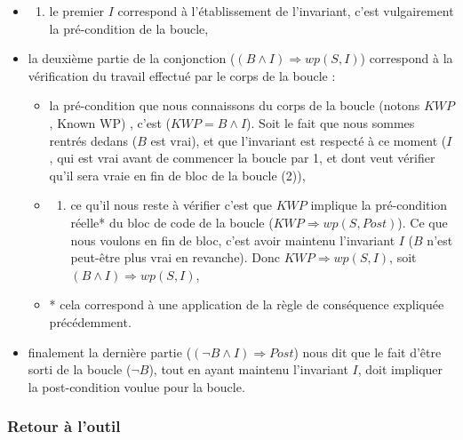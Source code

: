 \documentclass[12pt,francais,]{scrbook}
\providecommand{\tightlist}{%
  \setlength{\itemsep}{0pt}\setlength{\parskip}{0pt}}
\begin{document}
\begin{itemize}
\item
  \begin{enumerate}
  \def\labelenumi{(\arabic{enumi})}
  \tightlist
  \item
    le premier \(I\) correspond à l'établissement de l'invariant, c'est
    vulgairement la \og{}pré-condition\fg{} de la boucle,
  \end{enumerate}
\item
  la deuxième partie de la conjonction
  (\((B \wedge I) \Rightarrow wp(S, I)\)) correspond à la vérification
  du travail effectué par le corps de la boucle :

  \begin{itemize}
  \item
    la pré-condition que nous connaissons du corps de la boucle (notons
    \(KWP\), \og{}Known WP\fg{}) , c'est (\(KWP = B \wedge I\)). Soit le fait
    que nous sommes rentrés dedans (\(B\) est vrai), et que l'invariant
    est respecté à ce moment (\(I\), qui est vrai avant de commencer la
    boucle par 1, et dont veut vérifier qu'il sera vraie en fin de bloc
    de la boucle (2)),
  \item
    \begin{enumerate}
    \def\labelenumi{(\arabic{enumi})}
    \setcounter{enumi}{1}
    \tightlist
    \item
      ce qu'il nous reste à vérifier c'est que \(KWP\) implique la
      pré-condition réelle* du bloc de code de la boucle
      (\(KWP \Rightarrow wp(S, Post)\)). Ce que nous voulons en fin de
      bloc, c'est avoir maintenu l'invariant \(I\) (\(B\) n'est
      peut-être plus vrai en revanche). Donc
      \(KWP \Rightarrow wp(S, I)\), soit
      \((B \wedge I) \Rightarrow wp(S, I)\),
    \end{enumerate}
  \item
    * cela correspond à une application de la règle de conséquence
    expliquée précédemment.
  \end{itemize}
\item
  finalement la dernière partie (\((\neg B \wedge I) \Rightarrow Post\))
  nous dit que le fait d'être sorti de la boucle (\(\neg B\)), tout en
  ayant maintenu l'invariant \(I\), doit impliquer la post-condition
  voulue pour la boucle.
\end{itemize}

\subsubsection{Retour à l'outil}\label{retour-uxe0-loutil}
\end{document}
